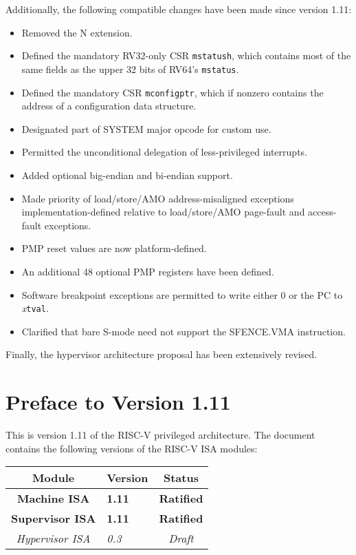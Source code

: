 Additionally, the following compatible changes have been made since version
1.11:
\vspace{-0.2in}
\begin{itemize}
  \parskip 0pt
  \itemsep 1pt
\item Removed the N extension.
\item Defined the mandatory RV32-only CSR {\tt mstatush}, which contains
  most of the same fields as the upper 32 bits of RV64's {\tt mstatus}.
\item Defined the mandatory CSR {\tt mconfigptr}, which if nonzero
  contains the address of a configuration data structure.
\item Designated part of SYSTEM major opcode for custom use.
\item Permitted the unconditional delegation of less-privileged interrupts.
\item Added optional big-endian and bi-endian support.
\item Made priority of load/store/AMO address-misaligned exceptions
  implementation-defined relative to load/store/AMO page-fault
  and access-fault exceptions.
\item PMP reset values are now platform-defined.
\item An additional 48 optional PMP registers have been defined.
\item Software breakpoint exceptions are permitted to write either 0
  or the PC to {\em x}\/{\tt tval}.
\item Clarified that bare S-mode need not support the SFENCE.VMA instruction.
\end{itemize}

Finally, the hypervisor architecture proposal has been extensively revised.

\newpage

\section*{Preface to Version 1.11}

This is version 1.11 of the RISC-V privileged architecture.
The document contains the following versions of the RISC-V ISA
modules:

{
\begin{table}[hbt]
  \centering
  \begin{tabular}{|c|l|c|}
    \hline
    Module             & Version  & Status\\
    \hline
    \bf Machine ISA    & \bf 1.11 & \bf Ratified \\
    \bf Supervisor ISA & \bf 1.11 & \bf Ratified \\
    \em Hypervisor ISA & \em 0.3  & \em Draft \\
    \hline
  \end{tabular}
\end{table}
}


